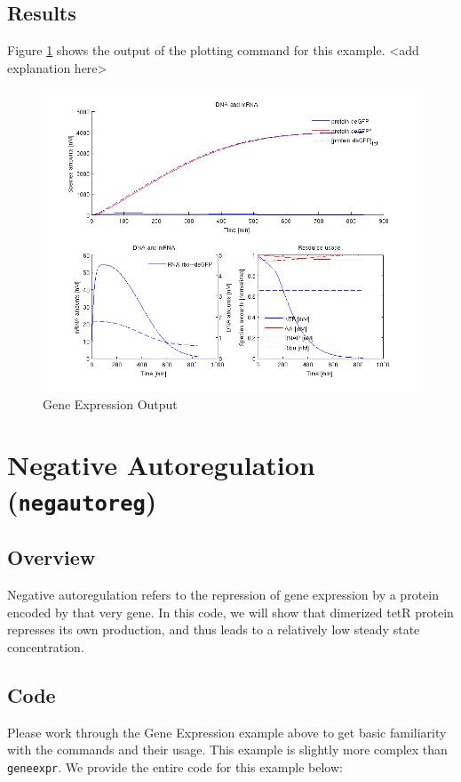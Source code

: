 \documentclass[english]{report}
\begin{document}
		\subsection{Results}
		
		Figure \ref{fig:geneexpr} shows the output of the plotting command for this example. {\color{red} <add explanation here>}
		\begin{figure}
		\begin{center}
		\includegraphics[width=\textwidth]{gene_expression_1nM.png} 
		\caption{Gene Expression Output}
		\label{fig:geneexpr}
		\end{center}
		
		\end{figure}
		
	\section{Negative Autoregulation (\texttt{negautoreg})}
		\subsection{Overview}
		Negative autoregulation refers to the repression of gene expression by a protein encoded by that very gene. In this code, we will show that dimerized tetR protein represses its own production, and thus leads to a relatively low steady state concentration. 
		\subsection{Code}
		Please work through the Gene Expression example above to get basic familiarity with the commands and their usage. This example is slightly more complex than \texttt{geneexpr}. We provide the entire code for this example below: \\
		
\end{document}

